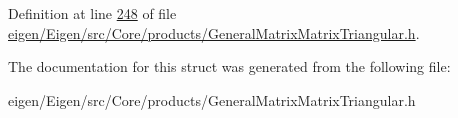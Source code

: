 Definition at line \hyperlink{eigen_2_eigen_2src_2_core_2products_2_general_matrix_matrix_triangular_8h_source_l00248}{248} of file \hyperlink{eigen_2_eigen_2src_2_core_2products_2_general_matrix_matrix_triangular_8h_source}{eigen/\+Eigen/src/\+Core/products/\+General\+Matrix\+Matrix\+Triangular.\+h}.



The documentation for this struct was generated from the following file\+:\begin{DoxyCompactItemize}
\item 
eigen/\+Eigen/src/\+Core/products/\+General\+Matrix\+Matrix\+Triangular.\+h\end{DoxyCompactItemize}
